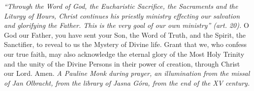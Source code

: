 \pagestyle{empty}
\hspace{0pt}
\vfill

\textit{``Through the Word of God, the Eucharistic Sacrifice, the
Sacraments and the Liturgy of Hours, Christ continues his priestly
ministry effecting our salvation and glorifying the Father. This is
the very goal of our own ministry'' (art. 20).}
\medbreak
O God our Father, you have sent your Son, the Word of
Truth, and the Spirit, the Sanctifier, to reveal to us the Mystery of
Divine life. Grant that we, who confess our true faith, may also
acknowledge the eternal glory of the Most Holy Trinity and the
unity of the Divine Persons in their power of creation, through
Christ our Lord. Amen.
\vfill
\textit{A Pauline Monk during prayer, an illumination from the missal of Jan Olbracht, from the library of Jasna Góra, from the end of the XV century.}
\hspace{0pt}
\newpage
